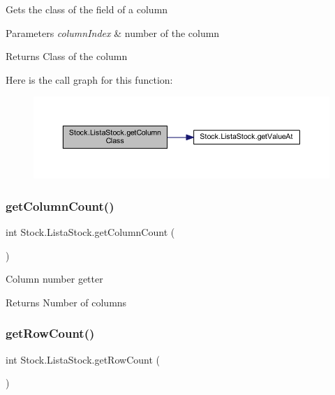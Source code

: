Gets the class of the field of a column 
\begin{DoxyParams}{Parameters}
{\em column\+Index} & number of the column \\
\hline
\end{DoxyParams}
\begin{DoxyReturn}{Returns}
Class of the column 
\end{DoxyReturn}
Here is the call graph for this function\+:
\nopagebreak
\begin{figure}[H]
\begin{center}
\leavevmode
\includegraphics[width=350pt]{class_stock_1_1_lista_stock_a18471e9271be7455310d9a277337c38e_cgraph}
\end{center}
\end{figure}
\mbox{\label{class_stock_1_1_lista_stock_ad1b8da2d5ddcb4627e47533953e12d84}} 
\subsubsection{\texorpdfstring{get\+Column\+Count()}{getColumnCount()}}
{\footnotesize\ttfamily int Stock.\+Lista\+Stock.\+get\+Column\+Count (\begin{DoxyParamCaption}{ }\end{DoxyParamCaption})}

Column number getter \begin{DoxyReturn}{Returns}
Number of columns 
\end{DoxyReturn}
\mbox{\label{class_stock_1_1_lista_stock_a52c69465417c81534f1433dc56f749d9}} 
\subsubsection{\texorpdfstring{get\+Row\+Count()}{getRowCount()}}
{\footnotesize\ttfamily int Stock.\+Lista\+Stock.\+get\+Row\+Count (\begin{DoxyParamCaption}{ }\end{DoxyParamCaption})}

